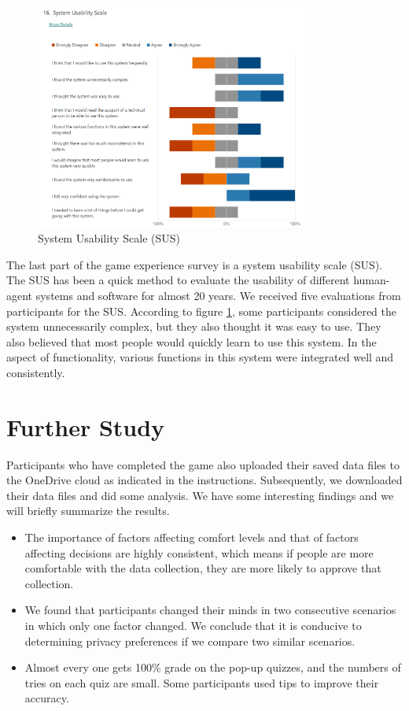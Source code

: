 \documentclass[msc,deptreport,ai]{infthesis}      %
\begin{document}
\begin{figure}[htbp]
    \centering
    \includegraphics[width=0.8\textwidth]{Survey7.png}
    \caption{System Usability Scale (SUS)}
    \label{fig:SUS}
\end{figure}

The last part of the game experience survey is a system usability scale (SUS). The SUS has been a quick method to evaluate the usability of different human-agent systems and software for almost 20 years\cite{Peres2013ValidationOT}. We received five evaluations from participants for the SUS. According to figure \ref{fig:SUS}, some participants considered the system unnecessarily complex, but they also thought it was easy to use. They also believed that most people would quickly learn to use this system. In the aspect of functionality, various functions in this system were integrated well and consistently.

\section{Further Study}

Participants who have completed the game also uploaded their saved data files to the OneDrive cloud as indicated in the instructions. Subsequently, we downloaded their data files and did some analysis. We have some interesting findings and we will briefly summarize the results.

\begin{itemize}
    \item The importance of factors affecting comfort levels and that of factors affecting decisions are highly consistent, which means if people are more comfortable with the data collection, they are more likely to approve that collection.
    
    \item We found that participants changed their minds in two consecutive scenarios in which only one factor changed. We conclude that it is conducive to determining privacy preferences if we compare two similar scenarios.
    
    \item Almost every one gets 100\% grade on the pop-up quizzes, and the numbers of tries on each quiz are small. Some participants used tips to improve their accuracy.
\end{itemize}
\end{document}
